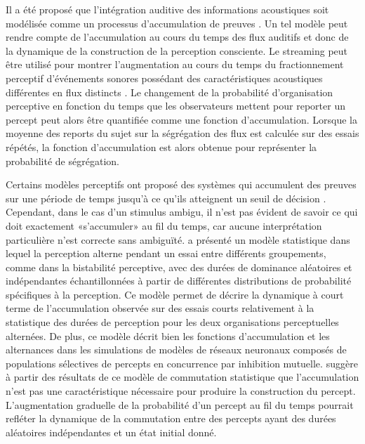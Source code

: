 Il a été proposé que l'intégration auditive des informations acoustiques soit modélisée comme un processus d'accumulation de preuves \citep{barniv2015auditory, nguyen2020buildup}. 
Un tel modèle peut rendre compte de l'accumulation au cours du temps des flux auditifs et donc de la dynamique de la construction de la perception consciente. 
Le streaming peut être utilisé pour montrer l'augmentation au cours du temps du fractionnement perceptif d'événements sonores possédant des caractéristiques acoustiques différentes en flux distincts \citep{anstis1985adaptation, cusack2004effects, pressnitzer2006temporal}.
Le changement de la probabilité d'organisation perceptive en fonction du temps que les observateurs mettent pour reporter un percept peut alors être quantifiée comme une fonction d'accumulation. 
Lorsque la moyenne des reports du sujet sur la ségrégation des flux est calculée sur des essais répétés, la fonction d'accumulation est alors obtenue pour représenter la probabilité de ségrégation. 

Certains modèles perceptifs ont proposé des systèmes qui accumulent des preuves sur une période de temps jusqu'à ce qu'ils atteignent un seuil de décision \citep{gold2007neural}. 
Cependant, dans le cas d'un stimulus ambigu, il n'est pas évident de savoir ce qui doit exactement «s'accumuler» au fil du temps, car aucune interprétation particulière n'est correcte sans ambiguïté. 
\cite{steele2016buildup} a présenté un modèle statistique dans lequel la perception alterne pendant un essai entre différents groupements, comme dans la bistabilité perceptive, avec des durées de dominance aléatoires et indépendantes échantillonnées à partir de différentes distributions de probabilité spécifiques à la perception. 
Ce modèle permet de décrire la dynamique à court terme de l'accumulation observée sur des essais courts relativement à la statistique des durées de perception pour les deux organisations perceptuelles alternées.
De plus, ce modèle décrit bien les fonctions d'accumulation et les alternances dans les simulations de modèles de réseaux neuronaux composés de populations sélectives de percepts en concurrence par inhibition mutuelle. 
\cite{steele2016buildup} suggère à partir des résultats de ce modèle de commutation statistique que l'accumulation n'est pas une caractéristique nécessaire pour produire la construction du percept. 
L'augmentation graduelle de la probabilité d'un percept au fil du temps pourrait refléter la dynamique de la commutation entre des percepts ayant des durées aléatoires indépendantes et un état initial donné. 

